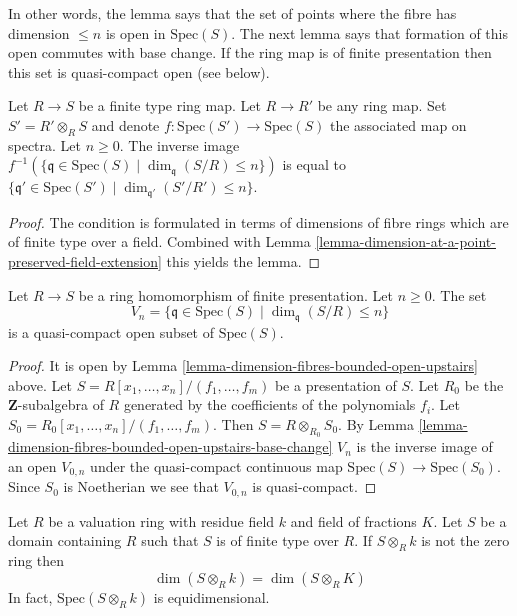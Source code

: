 \noindent
In other words, the lemma says that the set of points where the
fibre has dimension $\leq n$ is open in $\text{Spec}(S)$.
The next lemma says that formation of this open commutes with
base change.
If the ring map is of finite presentation then this set is
quasi-compact open (see below).

\begin{lemma}
\label{lemma-dimension-fibres-bounded-open-upstairs-base-change}
Let $R \to S$ be a finite type ring map.
Let $R \to R'$ be any ring map.
Set $S' = R' \otimes_R S$ and denote $f : \text{Spec}(S') \to \text{Spec}(S)$
the associated map on spectra.
Let $n \geq 0$.
The inverse image
$f^{-1}(\{\mathfrak q \in \text{Spec}(S) \mid
\dim_{\mathfrak q}(S/R) \leq n\})$
is equal to
$\{\mathfrak q' \in \text{Spec}(S') \mid
\dim_{\mathfrak q'}(S'/R') \leq n\}$.
\end{lemma}

\begin{proof}
The condition is formulated in terms of dimensions
of fibre rings which are of finite type over a field.
Combined with
Lemma \ref{lemma-dimension-at-a-point-preserved-field-extension}
this yields the lemma.
\end{proof}

\begin{lemma}
\label{lemma-dimension-fibres-bounded-quasi-compact-open-upstairs}
Let $R \to S$ be a ring homomorphism of finite presentation.
Let $n \geq 0$. The set
$$
V_n = \{\mathfrak q \in \text{Spec}(S) \mid \dim_{\mathfrak q}(S/R) \leq n\}
$$
is a quasi-compact open subset of $\text{Spec}(S)$.
\end{lemma}

\begin{proof}
It is open by Lemma \ref{lemma-dimension-fibres-bounded-open-upstairs} above.
Let $S = R[x_1, \ldots, x_n]/(f_1, \ldots, f_m)$ be a presentation of
$S$. Let $R_0$ be the $\mathbf{Z}$-subalgebra of $R$ generated by the
coefficients of the polynomials $f_i$.
Let $S_0 = R_0[x_1, \ldots, x_n]/(f_1, \ldots, f_m)$.
Then $S = R \otimes_{R_0} S_0$. By
Lemma \ref{lemma-dimension-fibres-bounded-open-upstairs-base-change}
$V_n$ is the inverse image of an open $V_{0, n}$ under the quasi-compact
continuous map $\text{Spec}(S) \to \text{Spec}(S_0)$. Since
$S_0$ is Noetherian we see that $V_{0, n}$ is quasi-compact.
\end{proof}

\begin{lemma}
\label{lemma-finite-type-domain-over-valuation-ring-dim-fibres}
Let $R$ be a valuation ring with residue field $k$ and field
of fractions $K$. Let $S$ be a domain containing $R$ such that
$S$ is of finite type over $R$. If $S \otimes_R k$ is not the
zero ring then
$$
\dim(S \otimes_R k) = \dim(S \otimes_R K)
$$
In fact, $\text{Spec}(S \otimes_R k)$ is equidimensional.
\end{lemma}


